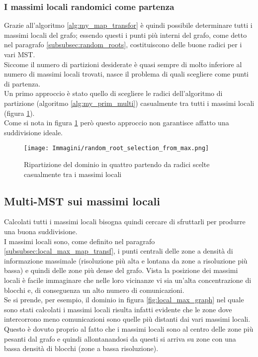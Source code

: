 {\subsubsection{I massimi locali randomici come partenza}
Grazie all'algoritmo \ref{alg:my_map_transfor} è quindi possibile determinare tutti i massimi locali del grafo; essendo questi i punti più interni del grafo, come detto nel paragrafo \ref{subsubsec:random_roots}, costituiscono delle buone radici per i vari MST.\\
Siccome il numero di partizioni desiderate è quasi sempre di molto inferiore al numero di massimi locali trovati, nasce il problema di quali scegliere come punti di partenza.\\
Un primo approccio è stato quello di scegliere le radici dell'algoritmo di partizione (algoritmo \ref{alg:my_prim_multi}) casualmente tra tutti i massimi locali (figura \ref{fig:randomo_local_max}).\\
Come si nota in figura \ref{fig:randomo_local_max} però questo approccio non garantisce affatto una suddivisione ideale.
\begin{figure}[H]
	\centering
	\texttt{[image: Immagini/random\_root\_selection\_from\_max.png]}
	\caption{Ripartizione del dominio in quattro partendo da radici scelte casualmente tra i massimi locali}
	\label{fig:randomo_local_max}
\end{figure}


\subsection{Multi-MST sui massimi locali}
Calcolati tutti i massimi locali bisogna quindi cercare di sfruttarli per produrre una buona suddivisione.\\
I massimi locali sono, come definito nel paragrafo \ref{subsubsec:local_max_map_transf}, i punti centrali delle zone a densità di informazione massimale (risoluzione più alta e lontana da zone a risoluzione più bassa) e quindi delle zone più dense del grafo. Vista la posizione dei massimi locali è facile immaginare che nelle loro vicinanze vi sia un'alta concentrazione di blocchi e, di conseguenza un alto numero di comunicazioni.\\
Se si prende, per esempio, il dominio in figura \ref{fig:local_max_graph} nel quale sono stati calcolati i massimi locali risulta infatti evidente che le zone dove intercorrono meno comunicazioni sono quelle più distanti dai vari massimi locali.\\
Questo è dovuto proprio al fatto che i massimi locali sono al centro delle zone più pesanti dal grafo e quindi allontanandosi da questi si arriva su zone con una bassa densità di blocchi (zone a bassa risoluzione).\\

}
